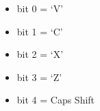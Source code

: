 \begin{itemize}
\item[] bit 0 = ‘V’
\item[] bit 1 = ‘C’
\item[] bit 2 = ‘X’
\item[] bit 3 = ‘Z’
\item[] bit 4 = Caps Shift
\end{itemize}

